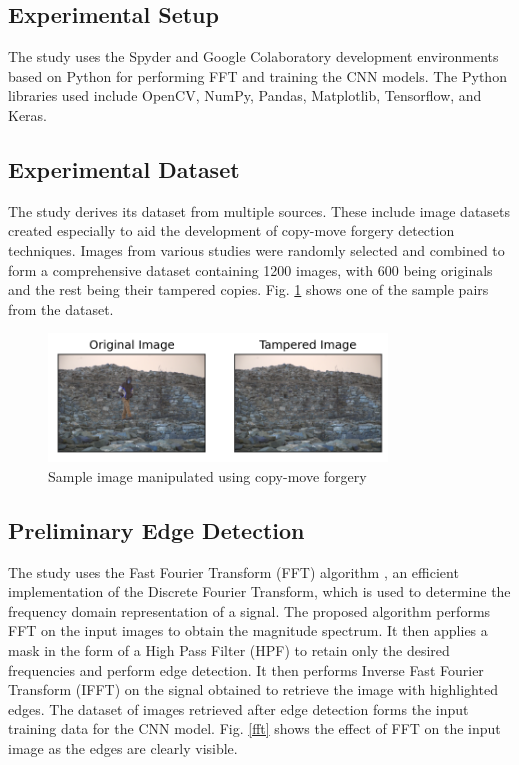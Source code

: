 \documentclass[conference]{IEEEtran}
\begin{document}
\subsection{Experimental Setup}
The study uses the Spyder and Google Colaboratory development environments based on Python for performing FFT and training the CNN models. The Python libraries used include OpenCV, NumPy, Pandas, Matplotlib, Tensorflow, and Keras.  

\subsection{Experimental Dataset}
The study derives its dataset from multiple sources. These include image datasets created especially to aid the development of copy-move forgery detection techniques. Images from various studies \cite{b4}  \cite{b5} \cite{b7} were randomly selected and combined to form a comprehensive dataset containing 1200 images, with 600 being originals and the rest being their tampered copies. Fig. \ref{tampered} shows one of the sample pairs from the dataset.

\begin{figure}[htpb]
\centerline{\includegraphics[width = 9cm]{tamp_up.png}}
\caption{Sample image manipulated using copy-move forgery}
\label{tampered}
\end{figure}

\subsection{Preliminary Edge Detection}
The study uses the Fast Fourier Transform (FFT) algorithm \cite{b10}, an efficient implementation of the Discrete Fourier Transform, which is used to determine the frequency domain representation of a signal. The proposed algorithm performs FFT on the input images to obtain the magnitude spectrum. It then applies a mask in the form of a High Pass Filter (HPF) to retain only the desired frequencies and perform edge detection. It then performs Inverse Fast Fourier Transform (IFFT) on the signal obtained to retrieve the image with highlighted edges. The dataset of images retrieved after edge detection forms the input training data for the CNN model. Fig. \ref{fft} shows the effect of FFT on the input image as the edges are clearly visible.
\end{document}
